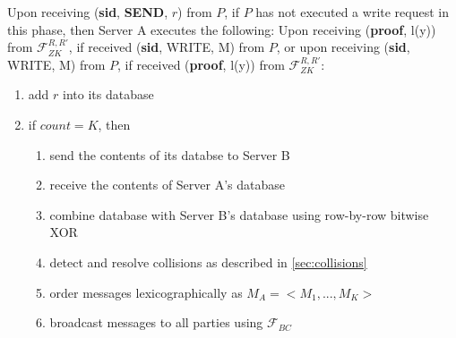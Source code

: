 \begin{tcolorbox}[colback=white, arc=5pt]
\extitem Upon receiving (\textbf{sid}, \textbf{SEND}, $r$) from $P$, if $P$ has not executed a write request in this phase, then
    Server A executes the following:
    Upon receiving (\textbf{proof}, l(y)) from $\mathcal{F}_{ZK}^{R,R'}$, if received (\textbf{sid}, WRITE, M) from $P$, or upon receiving (\textbf{sid}, WRITE, M) from $P$, if received (\textbf{proof}, l(y)) from $\mathcal{F}_{ZK}^{R,R'}$:
    \begin{enumerate}
        \item add $r$ into its database
        \item if $count=K$, then
        \begin{enumerate}
            \item send the contents of its databse to Server B
            \item receive the contents of Server A's database
            \item combine database with Server B's database using row-by-row bitwise XOR
            \item detect and resolve collisions as described in \ref{sec:collisions}
            \item order messages lexicographically as $M_A=<M_1,...,M_K>$
            \item broadcast messages to all parties using $\mathcal{F}_{BC}$
        \end{enumerate}
    \end{enumerate}
\end{tcolorbox}

\label{fig:riposte_protocol}
